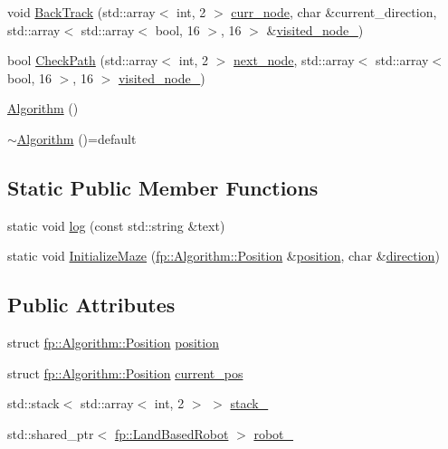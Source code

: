 \begin{DoxyCompactItemize}
\item 
void \hyperlink{classfp_1_1_algorithm_ab272faa6f88e5edbe2f8c19b2988ae16}{Back\+Track} (std\+::array$<$ int, 2 $>$ \hyperlink{classfp_1_1_algorithm_a88395e8c0b52c4aef33b41caff21300c}{curr\+\_\+node}, char \&current\+\_\+direction, std\+::array$<$ std\+::array$<$ bool, 16 $>$, 16 $>$ \&\hyperlink{classfp_1_1_algorithm_a41904cf962dd8c46901d39ab03d77545}{visited\+\_\+node\+\_\+})
\item 
bool \hyperlink{classfp_1_1_algorithm_a9270347a0ca5be0f7717e6772de5f87c}{Check\+Path} (std\+::array$<$ int, 2 $>$ \hyperlink{classfp_1_1_algorithm_ac3672498d86469ee445fe66a140952cb}{next\+\_\+node}, std\+::array$<$ std\+::array$<$ bool, 16 $>$, 16 $>$ \hyperlink{classfp_1_1_algorithm_a41904cf962dd8c46901d39ab03d77545}{visited\+\_\+node\+\_\+})
\item 
\hyperlink{classfp_1_1_algorithm_adaa1af41614b0d95c2a940cc87c68a2e}{Algorithm} ()
\item 
\hyperlink{classfp_1_1_algorithm_aefb8012b9e6457191d7fc16affe5a700}{$\sim$\+Algorithm} ()=default
\end{DoxyCompactItemize}
\subsection*{Static Public Member Functions}
\begin{DoxyCompactItemize}
\item 
static void \hyperlink{classfp_1_1_algorithm_ad8d891300bf2a5be160a629a93e7058d}{log} (const std\+::string \&text)
\item 
static void \hyperlink{classfp_1_1_algorithm_a69fe7bd633b0e23593e7808babe4e90d}{Initialize\+Maze} (\hyperlink{structfp_1_1_algorithm_1_1_position}{fp\+::\+Algorithm\+::\+Position} \&\hyperlink{classfp_1_1_algorithm_a841339b57c3d2739325f3f421ada43b6}{position}, char \&\hyperlink{classfp_1_1_algorithm_afdbf632b658aea1aef75caa90e60a8fc}{direction})
\end{DoxyCompactItemize}
\subsection*{Public Attributes}
\begin{DoxyCompactItemize}
\item 
struct \hyperlink{structfp_1_1_algorithm_1_1_position}{fp\+::\+Algorithm\+::\+Position} \hyperlink{classfp_1_1_algorithm_a841339b57c3d2739325f3f421ada43b6}{position}
\item 
struct \hyperlink{structfp_1_1_algorithm_1_1_position}{fp\+::\+Algorithm\+::\+Position} \hyperlink{classfp_1_1_algorithm_a94d3b3797f19988f49fbda76013c3899}{current\+\_\+pos}
\item 
std\+::stack$<$ std\+::array$<$ int, 2 $>$ $>$ \hyperlink{classfp_1_1_algorithm_a3a646d05e1d457e73608134417b55113}{stack\+\_\+}
\item 
std\+::shared\+\_\+ptr$<$ \hyperlink{classfp_1_1_land_based_robot}{fp\+::\+Land\+Based\+Robot} $>$ \hyperlink{classfp_1_1_algorithm_a9937e133d060b6216a30055dc400ac10}{robot\+\_\+}
\end{DoxyCompactItemize}
